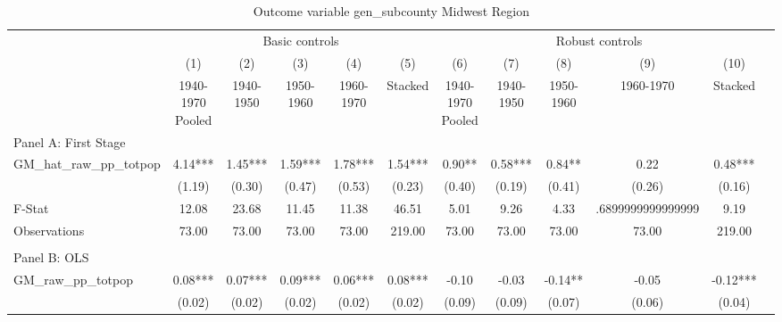  \begin{table}[htbp]\centering {} \begin{threeparttable} \caption{Outcome variable gen\_subcounty Midwest Region} \begin{tabular}{l*{11}{c}} \toprule
          &\multicolumn{5}{c}{Basic controls}                                   &\multicolumn{5}{c}{Robust controls}                                  \\\cmidrule(lr){2-6}\cmidrule(lr){7-11}
          &\multicolumn{1}{c}{(1)}&\multicolumn{1}{c}{(2)}&\multicolumn{1}{c}{(3)}&\multicolumn{1}{c}{(4)}&\multicolumn{1}{c}{(5)}&\multicolumn{1}{c}{(6)}&\multicolumn{1}{c}{(7)}&\multicolumn{1}{c}{(8)}&\multicolumn{1}{c}{(9)}&\multicolumn{1}{c}{(10)}\\
          &\multicolumn{1}{c}{1940-1970 Pooled}&\multicolumn{1}{c}{1940-1950}&\multicolumn{1}{c}{1950-1960}&\multicolumn{1}{c}{1960-1970}&\multicolumn{1}{c}{Stacked}&\multicolumn{1}{c}{1940-1970 Pooled}&\multicolumn{1}{c}{1940-1950}&\multicolumn{1}{c}{1950-1960}&\multicolumn{1}{c}{1960-1970}&\multicolumn{1}{c}{Stacked}\\
\cmidrule(lr){1-11}
\multicolumn{10}{l}{Panel A: First Stage}\\
\cmidrule(lr){1-11}
GM\_hat\_raw\_pp\_totpop&      4.14***&      1.45***&      1.59***&      1.78***&      1.54***&      0.90** &      0.58***&      0.84** &      0.22   &      0.48***\\
          &    (1.19)   &    (0.30)   &    (0.47)   &    (0.53)   &    (0.23)   &    (0.40)   &    (0.19)   &    (0.41)   &    (0.26)   &    (0.16)   \\
\midrule
F-Stat    &     12.08   &     23.68   &     11.45   &     11.38   &     46.51   &      5.01   &      9.26   &      4.33   &.6899999999999999   &      9.19   \\
Observations&     73.00   &     73.00   &     73.00   &     73.00   &    219.00   &     73.00   &     73.00   &     73.00   &     73.00   &    219.00   \\
\cmidrule[\heavyrulewidth](lr){1-11} \\ \cmidrule[\heavyrulewidth](lr){1-11}
\multicolumn{10}{l}{Panel B: OLS}\\
\cmidrule(lr){1-11}
GM\_raw\_pp\_totpop&      0.08***&      0.07***&      0.09***&      0.06***&      0.08***&     -0.10   &     -0.03   &     -0.14** &     -0.05   &     -0.12***\\
          &    (0.02)   &    (0.02)   &    (0.02)   &    (0.02)   &    (0.02)   &    (0.09)   &    (0.09)   &    (0.07)   &    (0.06)   &    (0.04)   \\

\end{tabular}
\end{threeparttable}
\end{table}
